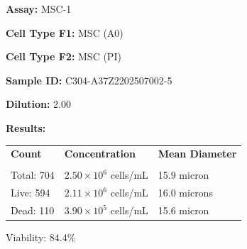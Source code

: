 \documentclass[UTF8,10pt,a4paper,fontset=fandol]{ctexart}
\newcommand{\fieldvalue}[1]{#1}
\begin{document}
\newpage

\noindent
\textbf{Assay:}
\fieldvalue{MSC-1}

\noindent
\textbf{Cell Type F1:}
\fieldvalue{MSC (A0)}

\noindent
\textbf{Cell Type F2:}
\fieldvalue{MSC (PI)}

\medskip
\noindent
\textbf{Sample ID:}
\fieldvalue{C304-A37Z2202507002-5}

\noindent
\textbf{Dilution:}
\fieldvalue{2.00}

\medskip
\noindent
\textbf{Results:}

\medskip
\noindent
\begin{tabularx}{\textwidth}{@{}X X X@{}}
\textbf{Count} & \textbf{Concentration} & \textbf{Mean Diameter} \\
\underline{\hspace{1.8cm}} & \underline{\hspace{2.3cm}} & \underline{\hspace{2.3cm}} \\[2pt]

Total:
\fieldvalue{704}
&
\fieldvalue{$2.50\times 10^6$ cells/mL}
&
\fieldvalue{15.9 micron}
\\

Live:
\fieldvalue{594}
&
\fieldvalue{$2.11\times 10^6$ cells/mL}
&
\fieldvalue{16.0 microns}
\\

Dead:
\fieldvalue{110}
&
\fieldvalue{$3.90\times 10^5$ cells/mL}
&
\fieldvalue{15.6 micron}
\end{tabularx}

\medskip
\noindent
Viability:
\fieldvalue{84.4\%}
\end{document}
